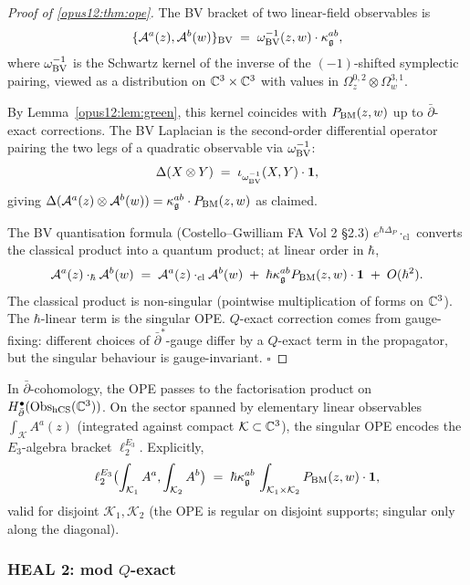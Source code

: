 \begin{proof}[Proof of \ref{opus12:thm:ope}]
The BV bracket of two linear-field observables is
\[
\{\mathcal{A}^a(z), \mathcal{A}^b(w)\}_{\mathrm{BV}} \;=\;
\omega_{\mathrm{BV}}^{-1}(z, w) \cdot \kappa_{\mathfrak{g}}^{ab},
\]
where $\omega_{\mathrm{BV}}^{-1}$ is the Schwartz kernel of the inverse of
the $(-1)$-shifted symplectic pairing, viewed as a distribution on
$\mathbb{C}^3 \times \mathbb{C}^3$ with values in
$\Omega^{0,2}_z \otimes \Omega^{3,1}_w$.

By Lemma~\ref{opus12:lem:green}, this kernel coincides with
$P_{\mathrm{BM}}(z, w)$ up to $\bar\partial$-exact corrections. The BV
Laplacian is the second-order differential operator pairing the
two legs of a quadratic observable via $\omega^{-1}_{\mathrm{BV}}$:
\[
\Delta(X \otimes Y) \;=\; \iota_{\omega^{-1}_{\mathrm{BV}}}(X, Y)
\cdot \mathbf{1},
\]
giving
$\Delta(\mathcal{A}^a(z) \otimes \mathcal{A}^b(w)) = \kappa^{ab}_{\mathfrak{g}} \cdot
P_{\mathrm{BM}}(z, w)$ as claimed.

The BV quantisation formula (Costello--Gwilliam FA Vol 2 §2.3)
$e^{\hbar \Delta_P} \cdot_{\mathrm{cl}}$ converts the classical
product into a quantum product; at linear order in $\hbar$,
\[
\mathcal{A}^a(z) \cdot_\hbar \mathcal{A}^b(w) \;=\;
\mathcal{A}^a(z) \cdot_{\mathrm{cl}} \mathcal{A}^b(w) \;+\; \hbar
\kappa^{ab}_{\mathfrak{g}} P_{\mathrm{BM}}(z, w) \cdot \mathbf{1}
\;+\; O(\hbar^2).
\]
The classical product is non-singular (pointwise multiplication of
forms on $\mathbb{C}^3$). The $\hbar$-linear term is the singular OPE.
$Q$-exact correction comes from gauge-fixing: different choices of
$\bar\partial^*$-gauge differ by a $Q$-exact term in the propagator,
but the singular behaviour is gauge-invariant. $\square$
\end{proof}

\begin{corollary}\ClaimStatusCorollary
\label{opus12:cor:ope-dolb}
In $\bar\partial$-cohomology, the OPE passes to the factorisation
product on $H^\bullet_{\bar\partial}(\mathrm{Obs}_{\mathrm{hCS}}(\mathbb{C}^3))$. On the
sector spanned by elementary linear observables
$\int_\mathcal{K} A^a(z)$ (integrated against compact
$\mathcal{K} \subset \mathbb{C}^3$), the singular OPE encodes the $E_3$-algebra
bracket $\ell_2^{E_3}$. Explicitly,
\[
\ell_2^{E_3}\bigl(\int_{\mathcal K_1} A^a, \int_{\mathcal K_2} A^b\bigr)
\;=\; \hbar \kappa^{ab}_{\mathfrak{g}} \, \int_{\mathcal K_1 \times \mathcal K_2}
P_{\mathrm{BM}}(z, w) \cdot \mathbf{1},
\]
valid for disjoint $\mathcal K_1, \mathcal K_2$ (the OPE is regular
on disjoint supports; singular only along the diagonal).
\end{corollary}

\subsubsection{HEAL 2: mod $Q$-exact}


